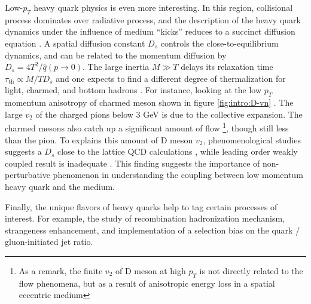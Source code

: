 Low-$p_T$ heavy quark physics is even more interesting.
In this region, collisional process dominates over radiative process, and the description of the heavy quark dynamics under the influence of medium ``kicks'' reduces to a succinct diffusion equation \cite{Moore:2004tg}.
A spatial diffusion constant $D_s$ controls the close-to-equilibrium dynamics, and can be related to the momentum diffusion by $D_s = 4T^2/\hat{q}(p\rightarrow 0)$.
The large inertia $M\gg T$ delays its relaxation time $\tau_{\textrm{th}} \propto M/T D_s$ and one expects to find a different degree of thermalization for light, charmed, and bottom hadrons \cite{PhysRevD.37.2484,Moore:2004tg,Riek:2010fk,Cao:2013ita}.
For instance, looking at the low $p_T$ momentum anisotropy of charmed meson shown in figure \ref{fig:intro:D-vn} \cite{Acharya:2017qps,Sirunyan:2017plt}.
The large $v_2$ of the charged pions below $3$ GeV is due to the collective expansion.
The charmed mesons also catch up a significant amount of flow \footnote{\singlespacing As a remark, the finite $v_2$ of D meson at high $p_T$ is not directly related to the flow phenomena, but as a result of anisotropic energy loss in a spatial eccentric medium}, though still less than the pion.
To explains this amount of D meson $v_2$, phenomenological studies suggests a $D_s$ close to the lattice QCD calculations \cite{He:2012df,Cao:2013ita,Xu:2017obm,Banerjee:2011ra,Ding:2012sp,Francis:2015daa}, while leading order weakly coupled result \cite{Moore:2004tg} is inadequate . 
This finding suggests the importance of non-perturbative phenomenon in understanding the coupling between low momentum heavy quark and the medium.

Finally, the unique flavors of heavy quarks help to tag certain processes of interest. 
For example, the study of recombination hadronization mechanism, strangeness enhancement, and implementation of a selection bias on the quark / gluon-initiated jet ratio.

